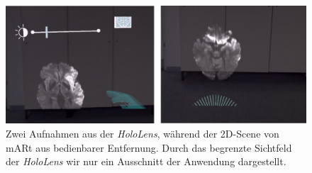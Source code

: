 \begin{figure}[!htb]
	\centering
	\includegraphics[width=0.9\linewidth]{images/mARt_Cutoff.png}
	\caption{Zwei Aufnahmen aus der \textit{HoloLens}, während der 2D-Scene von mARt aus bedienbarer Entfernung. Durch das begrenzte Sichtfeld der \textit{HoloLens} wir nur ein Ausschnitt der Anwendung dargestellt.}
	\label{img:ARCutoff}
\end{figure}
\FloatBarrier

